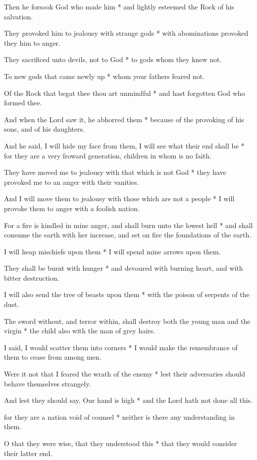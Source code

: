 Then he forsook God who made him * and lightly esteemed the Rock of his salvation.

They provoked him to jealousy with strange gods * with abominations provoked they him to anger.

They sacrificed unto devils, not to God * to gods whom they knew not.

To new gods that came newly up * whom your fathers feared not.

Of the Rock that begat thee thou art unmindful * and hast forgotten God who formed thee.

And when the Lord saw it, he abhorred them * because of the provoking of his sons, and of his daughters.

And he said, I will hide my face from them, I will see what their end shall be * for they are a very froward generation, children in whom is no faith.

They have moved me to jealousy with that which is not God * they have provoked me to an anger with their vanities.

And I will move them to jealousy with those which are not a people * I will provoke them to anger with a foolish nation.

For a fire is kindled in mine anger, and shall burn unto the lowest hell * and shall consume the earth with her increase, and set on fire the foundations of the earth.

I will heap mischiefs upon them * I will spend mine arrows upon them.

They shall be burnt with hunger * and devoured with burning heart, and with bitter destruction.

I will also send the tree of beasts upon them * with the poison of serpents of the dust.

The sword without, and terror within, shall destroy both the young man and the virgin * the child also with the man of grey hairs.

I said, I would scatter them into corners * I would make the remembrance of them to cease from among men.

Were it not that I feared the wrath of the enemy * lest their adversaries should behave themselves strangely.

And lest they should say, Our hand is high * and the Lord hath not done all this.

for they are a nation void of counsel * neither is there any understanding in them.

O that they were wise, that they understood this * that they would consider their latter end.

